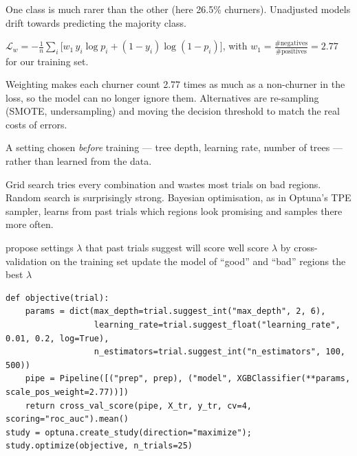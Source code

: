\documentclass[11pt,a4paper]{article}
\begin{document}

\begin{bdef}
One class is much rarer than the other (here 26.5\% churners). Unadjusted models drift towards predicting the majority class.
\end{bdef}
\begin{bmath}
$\mathcal{L}_w=-\frac1n\sum_i\big[w_1\,y_i\log p_i+(1-y_i)\log(1-p_i)\big]$, with $w_1=\frac{\#\text{negatives}}{\#\text{positives}}=2.77$ for our training set.
\end{bmath}
Weighting makes each churner count 2.77 times as much as a non-churner in the loss, so the model can no longer ignore them. Alternatives are re-sampling (SMOTE, undersampling) and moving the decision threshold to match the real costs of errors.

\begin{bdef}[Hyperparameter]
A setting chosen \emph{before} training --- tree depth, learning rate, number of trees --- rather than learned from the data.
\end{bdef}
Grid search tries every combination and wastes most trials on bad regions. Random search is surprisingly strong. Bayesian optimisation, as in Optuna's TPE sampler, learns from past trials which regions look promising and samples there more often.
\begin{balgo}
\begin{algorithmic}[1]
  \State propose settings $\lambda$ that past trials suggest will score well
  \State score $\lambda$ by cross-validation on the training set
  \State update the model of ``good'' and ``bad'' regions
\EndFor
\State \Return the best $\lambda$
\end{algorithmic}
\end{balgo}
\begin{bcode}
\begin{lstlisting}
def objective(trial):
    params = dict(max_depth=trial.suggest_int("max_depth", 2, 6),
                  learning_rate=trial.suggest_float("learning_rate", 0.01, 0.2, log=True),
                  n_estimators=trial.suggest_int("n_estimators", 100, 500))
    pipe = Pipeline([("prep", prep), ("model", XGBClassifier(**params, scale_pos_weight=2.77))])
    return cross_val_score(pipe, X_tr, y_tr, cv=4, scoring="roc_auc").mean()
study = optuna.create_study(direction="maximize"); study.optimize(objective, n_trials=25)
\end{lstlisting}
\end{bcode}
\end{document}

